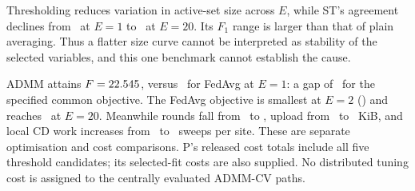 Thresholding reduces variation in active-set size across $E$, while ST's
agreement declines from \SstFone\ at $E=1$ to \SstFtwenty\ at
$E=20$. Its $F_1$ range is larger than that of plain averaging. Thus a
flatter size curve cannot be interpreted as stability of the selected
variables, and this one benchmark cannot establish the cause.

ADMM attains $F=22.545$, versus \Sfedobj\ for FedAvg at $E=1$:
a gap of \Sgappct\ for the specified common objective. The FedAvg
objective is smallest at $E=2$ (\Sfedobjtwo) and reaches
\Sfedobjtwenty\ at $E=20$. Meanwhile rounds fall from \Sroundsone\
to \Sroundstwenty, upload from \Skibone\ to \Skibtwenty~KiB,
and local CD work increases from \Sepochsone\ to \Sepochstwenty\
sweeps per site. These are separate optimisation and cost comparisons.
P's released cost totals include all five threshold candidates; its
selected-fit costs are also supplied. No distributed tuning cost is
assigned to the centrally evaluated ADMM-CV paths.
